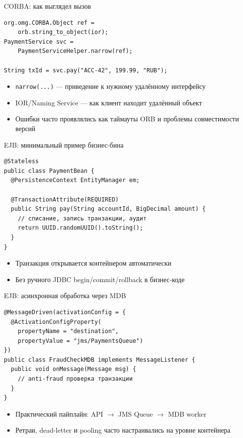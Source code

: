\documentclass{beamer}
\begin{document}
\begin{frame}[fragile]{CORBA: как выглядел вызов}
\begin{verbatim}
org.omg.CORBA.Object ref =
    orb.string_to_object(ior);
PaymentService svc =
    PaymentServiceHelper.narrow(ref);

String txId = svc.pay("ACC-42", 199.99, "RUB");
\end{verbatim}
\begin{itemize}
  \item \texttt{narrow(...)} --- приведение к нужному удалённому интерфейсу
  \item IOR/Naming Service --- как клиент находит удалённый объект
  \item Ошибки часто проявлялись как таймауты ORB и проблемы совместимости версий
\end{itemize}
\end{frame}

\begin{frame}[fragile]{EJB: минимальный пример бизнес-бина}
\begin{verbatim}
@Stateless
public class PaymentBean {
  @PersistenceContext EntityManager em;

  @TransactionAttribute(REQUIRED)
  public String pay(String accountId, BigDecimal amount) {
    // списание, запись транзакции, аудит
    return UUID.randomUUID().toString();
  }
}
\end{verbatim}
\begin{itemize}
  \item Транзакция открывается контейнером автоматически
  \item Без ручного JDBC begin/commit/rollback в бизнес-коде
\end{itemize}
\end{frame}

\begin{frame}[fragile]{EJB: асинхронная обработка через MDB}
\begin{verbatim}
@MessageDriven(activationConfig = {
  @ActivationConfigProperty(
    propertyName = "destination",
    propertyValue = "jms/PaymentsQueue")
})
public class FraudCheckMDB implements MessageListener {
  public void onMessage(Message msg) {
    // anti-fraud проверка транзакции
  }
}
\end{verbatim}
\begin{itemize}
  \item Практический пайплайн: API $\to$ JMS Queue $\to$ MDB worker
  \item Ретраи, dead-letter и pooling часто настраивались на уровне контейнера
\end{itemize}
\end{frame}
\end{document}
